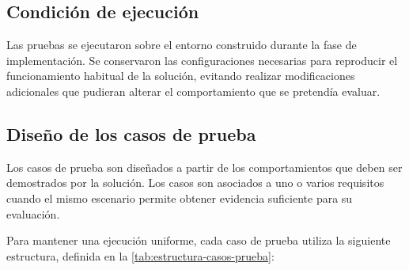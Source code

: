 \subsection{Condición de ejecución}
Las pruebas se ejecutaron sobre el entorno construido durante la fase de implementación. Se conservaron las configuraciones necesarias para reproducir el funcionamiento habitual de la solución, evitando realizar modificaciones adicionales que pudieran alterar el comportamiento que se pretendía evaluar.

\subsection{Diseño de los casos de prueba}
Los casos de prueba son diseñados a partir de los comportamientos que deben ser demostrados por la solución. Los casos son asociados a uno o varios requisitos cuando el mismo escenario permite obtener evidencia suficiente para su evaluación.

Para mantener una ejecución uniforme, cada caso de prueba utiliza la siguiente estructura, definida en la \autoref{tab:estructura-casos-prueba}:

\begingroup
\fontsize{8.5pt}{9.5pt}\selectfont
\renewcommand{\arraystretch}{1.3}
\setlength{\tabcolsep}{4pt}


